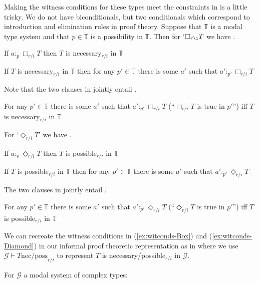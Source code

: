 \begin{shaded}
Making the witness conditions for these types meet the constraints in
\preveg{} is a little tricky.  We do not have biconditionals, but two
conditionals which correspond to introduction and elimination rules in
proof theory.  Suppose that $\mathbb{T}$ is a modal type system and
that $p\in\mathbb{T}$ is a possibility in $\mathbb{T}$. Then for
`$\Box_{r\i} T$ we have \nexteg{}.
\begin{ex} 
\begin{subex} 
 
\item If $a:_p\Box_{r/i}T$ then $T$ is necessary$_{r/i}$ in $\mathbb{T}$ 
 
\item If $T$ is necessary$_{r/i}$ in $\mathbb{T}$ then for any
  $p'\in\mathbb{T}$ there is some $a'$ such that $a':_{p'}\Box_{r/i}T$  
 
\end{subex} 
\label{ex:witconds-Box}   
\end{ex} 
Note that the two clauses in \preveg{} jointly entail \nexteg{}.
\begin{ex} 
For any $p'\in\mathbb{T}$ there is some $a'$ such that
$a':_{p'}\Box_{r/i}T$ (``$\Box_{r/i}T$ is true in $p'$'') iff $T$ is
necessary$_{r/i}$ in $\mathbb{T}$ 
\end{ex} 
For `$\Diamond_{r/i}T$' we have \nexteg{}.
\begin{ex} 
\begin{subex} 
 
\item If $a:_p\Diamond_{r/i}T$ then $T$ is possible$_{r/i}$ in $\mathbb{T}$ 
 
\item If $T$ is possible$_{r/i}$ in $\mathbb{T}$ then for any $p'\in\mathbb{T}$ there is some $a'$ such that $a':_{p'}\Diamond_{r/i}T$ 
 
\end{subex}
\label{ex:witconds-Diamond}
   
\end{ex} 
The two clauses in \preveg{} jointly entail \nexteg{}.
\begin{ex} 
For any $p'\in\mathbb{T}$ there is some $a'$ such that
$a':_{p'}\Diamond_{r/i}T$ (``$\Diamond_{r/i}T$ is true in $p'$'') iff $T$ is
possible$_{r/i}$ in $\mathbb{T}$ 
\end{ex} 
We can recreate the witness conditions in (\ref{ex:witconds-Box}) and
(\ref{ex:witconds-Diamond}) in our informal proof theoretic
representation as in \nexteg{} where we use $\mathcal{G}\vdash T\text{
  nec/poss}_{r/i}$ to represent $T$ is necessary/possible$_{r/i}$ in $\mathcal{G}$.
\begin{ex}
  For $\mathcal{G}$ a modal system of complex types:
\begin{subex} 
 

\end{subex}
\end{ex}
\end{shaded}
